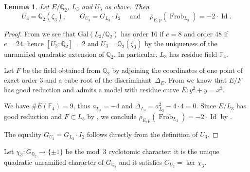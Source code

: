 \documentclass[12pt]{amsart}
\numberwithin{equation}{section}
\newtheorem{lemma}[equation]{Lemma}
\theoremstyle{definition}
\newcommand{\F}{\mathbb{F}}
\newcommand{\Q}{\mathbb{Q}}
\newcommand{\rhobar}{{\overline{\rho}}}
\newcommand{\Gal}{\text{Gal}}
\DeclareMathOperator{\Frob}{Frob}
\newcommand{\Ebar}{{\overline{E}}}
\DeclareMathOperator{\Id}{Id}
\begin{document}
\begin{lemma}\label{lem:l2non-ab}
    Let $E/\Q_2$, $L_3$ and $U_3$ as above. Then
    \[ U_3=\Q_2(\zeta_3), \qquad G_{U_3}=G_{L_3} \cdot I_2 \quad \text{ and } \quad \rhobar_{E,p}(\Frob_{L_3})=-2 \cdot \Id.\]
\end{lemma}
\begin{proof}

From \cite[Proposition 2]{doks} we see that
$\Gal(L_3/\Q_2)$ has order 16 if $e=8$ and order 48 if $e=24$, hence $[U_3 : \Q_2] = 2$ and $U_3 = \Q_2(\zeta_3)$ by the uniqueness of the unramified quadratic extension of $\Q_2$. In particular, $L_3$ has residue field $\F_4$.


Let $F$ be the field obtained from $\Q_2$ by adjoining the coordinates of one point of exact
order $3$ and a cube root of the discriminant~$\Delta_E$. From \cite[Lemma 2.1]{Cop2adic} we know that $E/F$ has good reduction and admits a model with residue curve $\Ebar: y^2+y=x^3$.

We have $\#\overline{E}(\F_4)=9$, thus $a_{L_3} = -4$ and $\Delta_{L_3} = a_{L_3}^2-4\cdot 4 = 0$.
Since $E/L_3$ has good reduction and $F \subset L_3$ by \cite[Lemma 6]{doks}, 
 we conclude $\rhobar_{E,p}(\Frob_{L_3})=-2 \cdot \Id$ by \cite[Theorem 2]{Centeleghe}.

The equality $G_{U_3}=G_{L_3} \cdot I_2$ follows directly from the definition of $U_3$.
\end{proof}

Let $\chi_3 : G_{\Q_2} \to \{ \pm 1 \}$ be the mod~$3$ cyclotomic character; it is the unique quadratic unramified character of $G_{\Q_2}$ 
and it satisfies $G_{U_3} = \ker \chi_3$.
\end{document}
